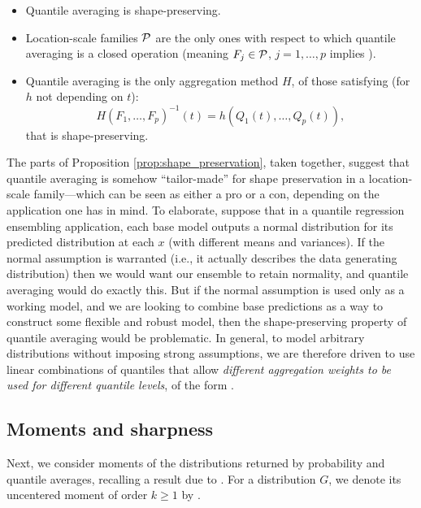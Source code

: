 \documentclass{article}
\begin{document}
\begin{proposition}
\label{prop:shape_preservation} \hfill 
\begin{itemize}
\item[(i)] Quantile averaging is shape-preserving.        
\item[(ii)] Location-scale families $\mathcal{P}$ are the only ones with respect to
  which quantile averaging is a closed operation (meaning $F_j \in \mathcal{P}$,
  $j=1,\dots,p$ implies ).     
\item[(iii)] Quantile averaging is the only aggregation method $H$, of those 
  satisfying (for $h$ not depending on $t$):  
  \[
    H(F_1,\dots,F_p)^{-1}(t) = h(Q_1(t),\dots,Q_p(t)),
  \]
  that is shape-preserving.
\end{itemize}
\end{proposition}

The parts of Proposition \ref{prop:shape_preservation}, taken together, suggest
that quantile averaging is somehow ``tailor-made'' for shape preservation in a
location-scale family---which can be seen as either a pro or a con, depending on
the application one has in mind. To elaborate, suppose that in a quantile
regression ensembling application, each base model outputs a normal distribution
for its predicted distribution at each $x$ (with different means and
variances). If the normal assumption is warranted (i.e., it actually describes
the data generating distribution) then we would want our ensemble to retain 
normality, and quantile averaging would do exactly this. But if the normal
assumption is used only as a working model, and we are looking to combine base
predictions as a way to construct some flexible and robust model, then the
shape-preserving property of quantile averaging would be problematic. In
general, to model arbitrary distributions without imposing strong assumptions,
we are therefore driven to use linear combinations of quantiles that allow 
\emph{different aggregation weights to be used for different quantile levels}, 
of the form . 

\subsection{Moments and sharpness}

Next, we consider moments of the distributions returned by probability and
quantile averages, recalling a result due to \citet{lichtendahl2013better}. For
a distribution $G$, we denote its uncentered moment of order $k \geq 1$ by 
.  
\end{document}
